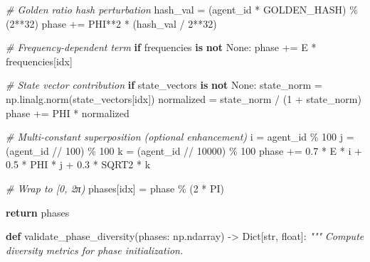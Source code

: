 \documentclass[
]{article}
\newenvironment{Shaded}{}{}
\newcommand{\BuiltInTok}[1]{\textcolor[rgb]{0.00,0.50,0.00}{#1}}
\newcommand{\CommentTok}[1]{\textcolor[rgb]{0.38,0.63,0.69}{\textit{#1}}}
\newcommand{\ControlFlowTok}[1]{\textcolor[rgb]{0.00,0.44,0.13}{\textbf{#1}}}
\newcommand{\DecValTok}[1]{\textcolor[rgb]{0.25,0.63,0.44}{#1}}
\newcommand{\FloatTok}[1]{\textcolor[rgb]{0.25,0.63,0.44}{#1}}
\newcommand{\KeywordTok}[1]{\textcolor[rgb]{0.00,0.44,0.13}{\textbf{#1}}}
\newcommand{\NormalTok}[1]{#1}
\newcommand{\OperatorTok}[1]{\textcolor[rgb]{0.40,0.40,0.40}{#1}}
\newcommand{\VariableTok}[1]{\textcolor[rgb]{0.10,0.09,0.49}{#1}}
\begin{document}
\begin{Shaded}
\begin{Highlighting}[]
        \CommentTok{\# Golden ratio hash perturbation}
\NormalTok{        hash\_val }\OperatorTok{=}\NormalTok{ (agent\_id }\OperatorTok{*}\NormalTok{ GOLDEN\_HASH) }\OperatorTok{\%}\NormalTok{ (}\DecValTok{2}\OperatorTok{**}\DecValTok{32}\NormalTok{)}
\NormalTok{        phase }\OperatorTok{+=}\NormalTok{ PHI}\OperatorTok{**}\DecValTok{2} \OperatorTok{*}\NormalTok{ (hash\_val }\OperatorTok{/} \DecValTok{2}\OperatorTok{**}\DecValTok{32}\NormalTok{)}

        \CommentTok{\# Frequency{-}dependent term}
        \ControlFlowTok{if}\NormalTok{ frequencies }\KeywordTok{is} \KeywordTok{not} \VariableTok{None}\NormalTok{:}
\NormalTok{            phase }\OperatorTok{+=}\NormalTok{ E }\OperatorTok{*}\NormalTok{ frequencies[idx]}

        \CommentTok{\# State vector contribution}
        \ControlFlowTok{if}\NormalTok{ state\_vectors }\KeywordTok{is} \KeywordTok{not} \VariableTok{None}\NormalTok{:}
\NormalTok{            state\_norm }\OperatorTok{=}\NormalTok{ np.linalg.norm(state\_vectors[idx])}
\NormalTok{            normalized }\OperatorTok{=}\NormalTok{ state\_norm }\OperatorTok{/}\NormalTok{ (}\DecValTok{1} \OperatorTok{+}\NormalTok{ state\_norm)}
\NormalTok{            phase }\OperatorTok{+=}\NormalTok{ PHI }\OperatorTok{*}\NormalTok{ normalized}

        \CommentTok{\# Multi{-}constant superposition (optional enhancement)}
\NormalTok{        i }\OperatorTok{=}\NormalTok{ agent\_id }\OperatorTok{\%} \DecValTok{100}
\NormalTok{        j }\OperatorTok{=}\NormalTok{ (agent\_id }\OperatorTok{//} \DecValTok{100}\NormalTok{) }\OperatorTok{\%} \DecValTok{100}
\NormalTok{        k }\OperatorTok{=}\NormalTok{ (agent\_id }\OperatorTok{//} \DecValTok{10000}\NormalTok{) }\OperatorTok{\%} \DecValTok{100}
\NormalTok{        phase }\OperatorTok{+=} \FloatTok{0.7} \OperatorTok{*}\NormalTok{ E }\OperatorTok{*}\NormalTok{ i }\OperatorTok{+} \FloatTok{0.5} \OperatorTok{*}\NormalTok{ PHI }\OperatorTok{*}\NormalTok{ j }\OperatorTok{+} \FloatTok{0.3} \OperatorTok{*}\NormalTok{ SQRT2 }\OperatorTok{*}\NormalTok{ k}

        \CommentTok{\# Wrap to [0, 2π)}
\NormalTok{        phases[idx] }\OperatorTok{=}\NormalTok{ phase }\OperatorTok{\%}\NormalTok{ (}\DecValTok{2} \OperatorTok{*}\NormalTok{ PI)}

    \ControlFlowTok{return}\NormalTok{ phases}


\KeywordTok{def}\NormalTok{ validate\_phase\_diversity(phases: np.ndarray) }\OperatorTok{{-}\textgreater{}}\NormalTok{ Dict[}\BuiltInTok{str}\NormalTok{, }\BuiltInTok{float}\NormalTok{]:}
    \CommentTok{"""}
\CommentTok{    Compute diversity metrics for phase initialization.}


\end{Highlighting}
\end{Shaded}
\end{document}
